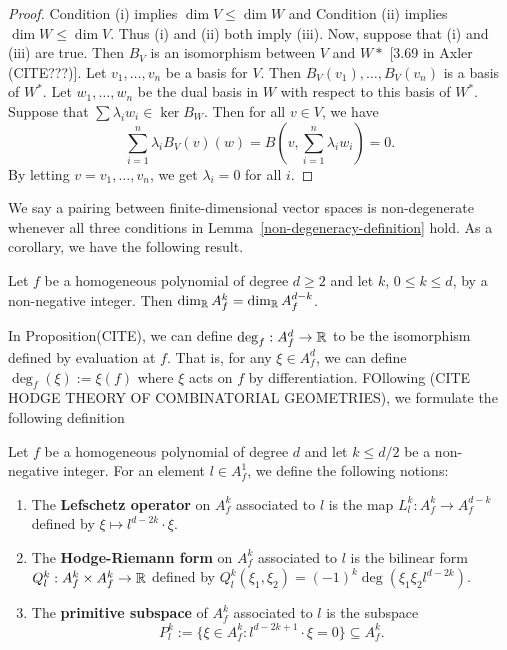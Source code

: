 \documentclass{puthesis-UG}
\begin{document}
	\begin{proof}
		Condition (i) implies $\dim V \leq \dim W$ and Condition (ii) implies $\dim W \leq \dim V$. Thus (i) and (ii) both imply (iii). Now, suppose that (i) and (iii) are true. Then $B_V$ is an isomorphism between $V$ and $W*$ [3.69 in Axler (CITE???)]. Let $v_1, \ldots, v_n$ be a basis for $V$. Then $B_V(v_1), \ldots, B_V(v_n)$ is a basis of $W^*$. Let $w_1, \ldots, w_n$ be the dual basis in $W$ with respect to this basis of $W^*$. Suppose that $\sum \lambda_i w_i \in \ker B_W$. Then for all $v \in V$, we have 
		\[
			\sum_{i = 1}^n \lambda_i B_V(v)(w) = B \left ( v, \sum_{i = 1}^n \lambda_i w_i \right ) = 0. 
		\]
		By letting $v = v_1, \ldots, v_n$, we get $\lambda_i = 0$ for all $i$. 
	\end{proof}

We say a pairing between finite-dimensional vector spaces is non-degenerate whenever all three conditions in Lemma~\ref{non-degeneracy-definition} hold. As a corollary, we have the following result.

\begin{cor} \label{same-dimensions}
	Let $f$ be a homogeneous polynomial of degree $d \geq 2$ and let $k$, $0 \leq k \leq d$, by a non-negative integer. Then $\dim_{\mathbb{R}} A_f^k = \dim_{\mathbb{R}} A_f^{d-k}$. 
\end{cor}

In Proposition(CITE), we can define $\deg_f : A_f^d \to \mathbb{R}$ to be the isomorphism defined by evaluation at $f$. That is, for any $\xi \in A_f^d$, we can define $\deg_f (\xi) := \xi(f)$ where $\xi$ acts on $f$ by differentiation. FOllowing (CITE HODGE THEORY OF COMBINATORIAL GEOMETRIES), we formulate the following definition

\begin{defn}
	Let $f$ be a homogeneous polynomial of degree $d$ and let $k \leq d/2$ be a non-negative integer. For an element $l \in A_f^1$, we define the following notions:
	\begin{enumerate}[label = (\alph*)]
		\item The \textbf{Lefschetz operator} on $A_f^k$ associated to $l$ is the map $L_l^k : A_f^k \to A_f^{d-k}$ defined by $\xi \mapsto l^{d-2k} \cdot \xi$. 

		\item The \textbf{Hodge-Riemann form} on $A_f^k$ associated to $l$ is the bilinear form $Q_l^k : A_f^k \times A_f^k \to \mathbb{R}$ defined by $Q_l^k (\xi_1, \xi_2) = (-1)^k \deg (\xi_1 \xi_2 l^{d-2k})$.

		\item The \textbf{primitive subspace} of $A_f^k$ associated to $l$ is the subspace
		\[
			P_l^k := \{\xi \in A_f^k : l^{d-2k+1} \cdot \xi = 0\} \subseteq A_f^k.
		\]
	\end{enumerate}
\end{defn}
\end{document}
